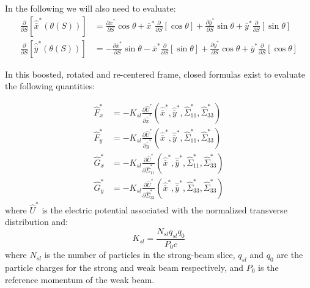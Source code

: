 In the following we will also need to evaluate:
\begin{align}
\frac{\partial }{\partial S} \left[\hat{\overline{x}}^*\left(\theta (S)\right) \right] &= 
 \frac{\partial \overline{x}^* }{\partial S}  \cos \theta
+ \overline{x}^*  \frac{\partial }{\partial S} \left[ \cos \theta \right] 
+ \frac{\partial \overline{y}^* }{\partial S}  \sin \theta
+ \overline{y}^*\frac{\partial }{\partial S} \left[ \sin \theta \right]  \\
\frac{\partial }{\partial S} \left[\hat{\overline{y}}^*\left(\theta (S)\right) \right] &= 
- \frac{\partial \overline{x}^* }{\partial S}  \sin \theta
-\overline{x}^*  \frac{\partial }{\partial S} \left[ \sin \theta \right] 
+  \frac{\partial \overline{y}^* }{\partial S}  \cos \theta
+ \overline{y}^*\frac{\partial }{\partial S} \left[ \cos \theta \right]  
\end{align}



In this boosted, rotated and re-centered frame, closed formulas exist to evaluate the following quantities:

\begin{align}
\hat{F}^*_x &= -K_{sl} \frac{\partial \hat{U}^*}{\partial \hat{\overline{x}}^*}\left(\hat{\overline{x}}^*, \hat{\overline{y}}^* , \hat{\Sigma}^*_{11}, \hat{\Sigma}^*_{33}\right) \label{eq:firstf}\\
%
\hat{F}^*_y &= -K_{sl}\frac{\partial \hat{U}^*}{\partial \hat{\overline{y}}^*}\left(\hat{\overline{x}}^*, \hat{\overline{y}}^* , \hat{\Sigma}^*_{11}, \hat{\Sigma}^*_{33}\right)\\
%
\hat{G}^*_x &= -K_{sl}\frac{\partial \hat{U}^*}{\partial \hat{\Sigma}^*_{11}}\left(\hat{\overline{x}}^*, \hat{\overline{y}}^* , \hat{\Sigma}^*_{11}, \hat{\Sigma}^*_{33}\right)\\
%
\hat{G}^*_y &= -K_{sl}\frac{\partial \hat{U}^*}{\partial \hat{\Sigma}^*_{33}}\left(\hat{\overline{x}}^*, \hat{\overline{y}}^* , \hat{\Sigma}^*_{33}, \hat{\Sigma}^*_{33} \right) \label{eq:lastf}
\end{align}
where $\hat{U}^*$ is the electric potential associated with the normalized transverse distribution and:
\begin{equation}
K_{sl} = \frac{N_{sl} q_{sl} q_0}{P_0 c}
\label{eq:factor}
\end{equation}
where $N_{sl}$ is the number of particles in the strong-beam slice, $q_{sl}$ and $q_0$ are the particle charges for the strong and weak beam respectively, and $P_0$ is the reference momentum of the weak beam.

